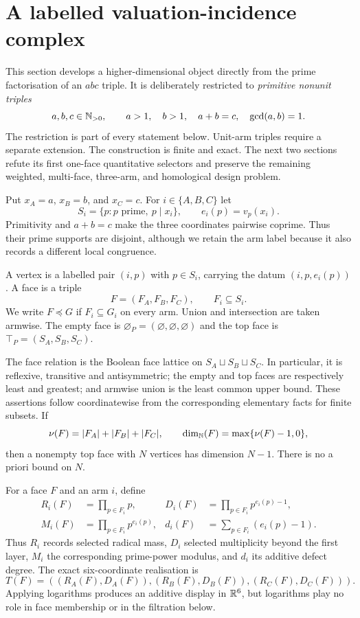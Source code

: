 \section{A labelled valuation-incidence complex}\label{sec:valuation-incidence-complex}

This section develops a higher-dimensional object directly from the prime
factorisation of an $abc$ triple.  It is deliberately restricted to
\emph{primitive nonunit triples}
\[
 a,b,c\in\mathbb N_{>0},\qquad a>1,\quad b>1,\quad a+b=c,
 \quad \gcd(a,b)=1.
\]
The restriction is part of every statement below.  Unit-arm triples require a
separate extension.  The construction is finite and exact.  The next two
sections refute its first one-face quantitative selectors and preserve the
remaining weighted, multi-face, three-arm, and homological design problem.

Put $x_A=a$, $x_B=b$, and $x_C=c$.  For $i\in\{A,B,C\}$ let
\[
 S_i=\{p:p\text{ prime},\ p\mid x_i\},\qquad e_i(p)=v_p(x_i).
\]
Primitivity and $a+b=c$ make the three coordinates pairwise coprime.  Thus
their prime supports are disjoint, although we retain the arm label because it
also records a different local congruence.

\begin{definition}
A vertex is a labelled pair $(i,p)$ with $p\in S_i$, carrying the datum
$(i,p,e_i(p))$.  A face is a triple
\[
 F=(F_A,F_B,F_C),\qquad F_i\subseteq S_i.
\]
We write $F\preceq G$ if $F_i\subseteq G_i$ on every arm.  Union and
intersection are taken armwise.  The empty face is
$\varnothing_P=(\varnothing,\varnothing,\varnothing)$ and the top face is
$\top_P=(S_A,S_B,S_C)$.
\end{definition}

The face relation is the Boolean face lattice on
$S_A\sqcup S_B\sqcup S_C$.  In particular, it is reflexive, transitive and
antisymmetric; the empty and top faces are respectively least and greatest;
and armwise union is the least common upper bound.  These assertions follow
coordinatewise from the corresponding elementary facts for finite subsets.
If
\[
 \nu(F)=|F_A|+|F_B|+|F_C|,
 \qquad \dim_{\mathbb N}(F)=\max\{\nu(F)-1,0\},
\]
then a nonempty top face with $N$ vertices has dimension $N-1$.  There is no
a priori bound on $N$.

For a face $F$ and an arm $i$, define
\[
 \begin{aligned}
 R_i(F)&=\prod_{p\in F_i}p,&
 D_i(F)&=\prod_{p\in F_i}p^{e_i(p)-1},\\
 M_i(F)&=\prod_{p\in F_i}p^{e_i(p)},&
 d_i(F)&=\sum_{p\in F_i}(e_i(p)-1).
 \end{aligned}
\]
Thus $R_i$ records selected radical mass, $D_i$ selected multiplicity beyond
the first layer, $M_i$ the corresponding prime-power modulus, and $d_i$ its
additive defect degree.  The exact six-coordinate realisation is
\[
 T(F)=((R_A(F),D_A(F)),(R_B(F),D_B(F)),(R_C(F),D_C(F))).
\]
Applying logarithms produces an additive display in $\mathbb R^6$, but logarithms
play no role in face membership or in the filtration below.

